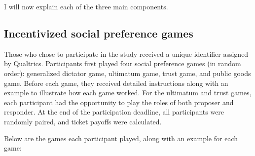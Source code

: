 \documentclass[12pt]{article}
\begin{document}
I will now explain each of the three main components.

\subsection{Incentivized social preference games}

Those who chose to participate in the study received a unique identifier assigned by Qualtrics. Participants first played four social preference games (in random order): generalized dictator game, ultimatum game, trust game, and public goods game. Before each game, they received detailed instructions along with an example to illustrate how each game worked. For the ultimatum and trust games, each participant had the opportunity to play the roles of both proposer and responder. At the end of the participation deadline, all participants were randomly paired, and ticket payoffs were calculated.

Below are the games each participant played, along with an example for each game: 
\end{document}
